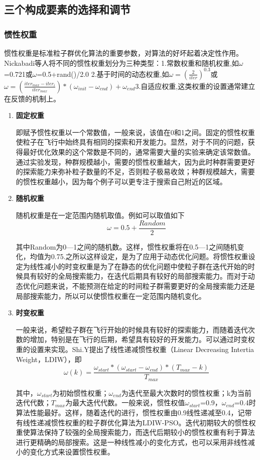\subsection{三个构成要素的选择和调节}
\subsubsection{惯性权重}
惯性权重是标准粒子群优化算法的重要参数，对算法的好坏起着决定性作用。Nickabadi等人将不同的惯性权重划分为三种类型：1.常数权重和随机权重,如$\omega$=0.721或$\omega$=0.5+rand()/2.0
	2.基于时间的动态权重,如$\omega={(\frac{2}{iter})}^{0.3}$或$\omega=(\frac{{iter}_{max}-{iter}_i}{{iter}_{max}})*(\omega_{init}-\omega_{end})+\omega_{end}$3.自适应权重,这类权重的设置通常建立在反馈的机制上。
\begin{enumerate}
	\item \textbf{固定权重}
	
	\hspace{2em} 即赋予惯性权重以一个常数值，一般来说，该值在0和1之间。固定的惯性权重使粒子在飞行中始终具有相同的探索和开发能力。显然，对于不同的问题，获得最好优化效果的这个常数是不同的，通常需要大量的实验来确定该常数值。通过实验发现，种群规模越小，需要的惯性权重越大，因为此时种群需要更好的探索能力来弥补粒子数量的不足，否则粒子极易收敛；种群规模越大，需要的惯性权重越小，因为每个例子可以更专注于搜索自己附近的区域。
	\item \textbf{随机权重}
	
	\hspace{2em}随机权重是在一定范围内随机取值。例如可以取值如下$$\omega=0.5+\frac{Random}{2}$$
	
	其中Random为0—1之间的随机数。这样，惯性权重将在0.5—1之间随机变化，均值为0.75.之所以这样设定，是为了应用于动态优化问题。将惯性权重设定为线性减小的时变权重是为了在静态的优化问题中使粒子群在迭代开始的时候具有较好的全局搜索能力，在迭代后期具有较好的局部搜索能力。而对于动态优化问题来说，不能预测在给定的时间粒子群需要更好的全局搜索能力还是局部搜索能力，所以可以使惯性权重在一定范围内随机变化。
	\item \textbf{时变权重}
	
	\hspace{2em}一般来说，希望粒子群在飞行开始的时候具有较好的探索能力，而随着迭代次数的增加，特别是在飞行的后期，希望具有较好的开发能力。可以通过时变权重的设置来实现。Shi.Y提出了线性递减惯性权重（Linear Decreasing Intertia Weight，LDIW），即$$\omega(k)=\frac{\omega_{start}*(\omega_{start}-\omega_{end})*(T_{max}-k)}{T_{max}}$$
	
	\hspace{2em}其中，$\omega_{start}$为初始惯性权重；$\omega_{end}$为迭代至最大次数时的惯性权重；k为当前迭代代数；$T_{max}$为最大迭代代数。一般来说，惯性权值$\omega_{start}$=0.9，$\omega_{end}$=0.4时算法性能最好。这样，随着迭代的进行，惯性权重由0.9线性递减至0.4，记带有线性递减惯性权重的粒子群优化算法为LDIW-PSO。迭代初期较大的惯性权重使算法保持了较强的全局搜索能力，而迭代后期较小的惯性权重有利于算法进行更精确的局部搜索。这是一种线性减小的变化方式，也可以采用非线性减小的变化方式来设置惯性权重。
	

\end{enumerate}
